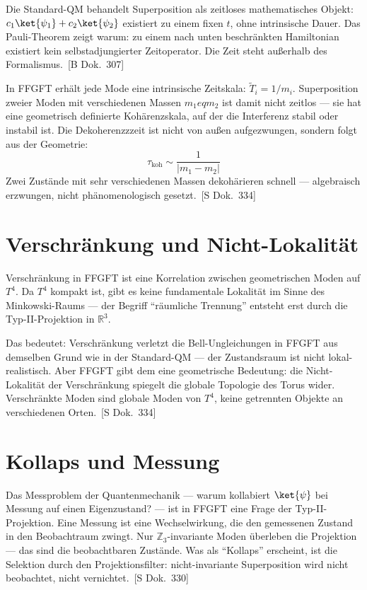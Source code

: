 \documentclass[11pt,oneside]{book}
\newcommand{\status}[1]{\penalty10000\,{\scriptsize\textcolor{gray!60}{[#1]}}}
\begin{document}
Die Standard-QM behandelt Superposition als zeitloses mathematisches
Objekt: $c_1\ket{\psi_1} + c_2\ket{\psi_2}$ existiert zu einem fixen
$t$, ohne intrinsische Dauer. Das Pauli-Theorem zeigt warum: zu einem
nach unten beschränkten Hamiltonian existiert kein selbstadjungierter
Zeitoperator. Die Zeit steht außerhalb des Formalismus. \status{B Dok.~307}

In FFGFT erhält jede Mode eine intrinsische Zeitskala:
$\tilde{T}_i = 1/m_i$. Superposition zweier Moden mit verschiedenen
Massen $m_1 
eq m_2$ ist damit nicht zeitlos — sie hat eine
geometrisch definierte Kohärenzskala, auf der die Interferenz stabil
oder instabil ist. Die Dekoherenzzzeit ist nicht von außen aufgezwungen,
sondern folgt aus der Geometrie:
\[
  \tau_\text{koh} \sim \frac{1}{|m_1 - m_2|}
\]
Zwei Zustände mit sehr verschiedenen Massen dekohärieren schnell —
algebraisch erzwungen, nicht phänomenologisch gesetzt. \status{S Dok.~334}

\section*{Verschränkung und Nicht-Lokalität}

Verschränkung in FFGFT ist eine Korrelation zwischen geometrischen Moden
auf $T^4$. Da $T^4$ kompakt ist, gibt es keine fundamentale Lokalität
im Sinne des Minkowski-Raums — der Begriff \enquote{räumliche Trennung} entsteht
erst durch die Typ-II-Projektion in $\mathbb{R}^3$.

Das bedeutet: Verschränkung verletzt die Bell-Ungleichungen in FFGFT aus
demselben Grund wie in der Standard-QM — der Zustandsraum ist nicht lokal-
realistisch. Aber FFGFT gibt dem eine geometrische Bedeutung: die
Nicht-Lokalität der Verschränkung spiegelt die globale Topologie des Torus
wider. Verschränkte Moden sind globale Moden von $T^4$, keine getrennten
Objekte an verschiedenen Orten. \status{S Dok.~334}

\section*{Kollaps und Messung}

Das Messproblem der Quantenmechanik — warum kollabiert $\ket{\psi}$ bei
Messung auf einen Eigenzustand? — ist in FFGFT eine Frage der
Typ-II-Projektion. Eine Messung ist eine Wechselwirkung, die den
gemessenen Zustand in den Beobachtraum zwingt. Nur $\mathbb{Z}_3$-invariante
Moden überleben die Projektion — das sind die beobachtbaren Zustände.
Was als \enquote{Kollaps} erscheint, ist die Selektion durch den Projektionsfilter:
nicht-invariante Superposition wird nicht beobachtet, nicht vernichtet.
\status{S Dok.~330}
\end{document}
